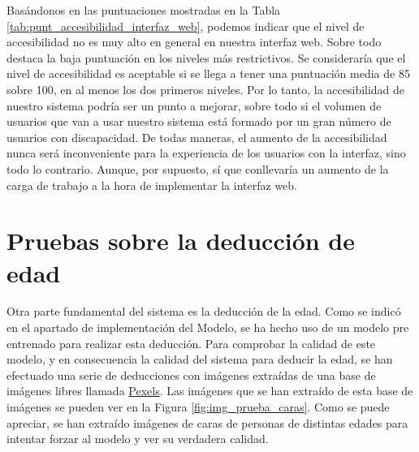 Basándonos en las puntuaciones mostradas en la Tabla \ref{tab:punt_accesibilidad_interfaz_web}, podemos indicar que el nivel de accesibilidad no es muy alto en general en nuestra interfaz web. Sobre todo destaca la baja puntuación en los niveles más restrictivos. Se consideraría que el nivel de accesibilidad es aceptable si se llega a tener una puntuación media de 85 sobre 100, en al menos los dos primeros niveles. Por lo tanto, la accesibilidad de nuestro sistema podría ser un punto a mejorar, sobre todo si el volumen de usuarios que van a usar nuestro sistema está formado por un gran número de usuarios con discapacidad. De todas maneras, el aumento de la accesibilidad nunca será inconveniente para la experiencia de los usuarios con la interfaz, sino todo lo contrario. Aunque, por supuesto, sí que conllevaría un aumento de la carga de trabajo a la hora de implementar la interfaz web.

\section{Pruebas sobre la deducción de edad}

Otra parte fundamental del sistema es la deducción de la edad. Como se indicó en el apartado de implementación del Modelo, se ha hecho uso de un modelo pre entrenado para realizar esta deducción. Para comprobar la calidad de este modelo, y en consecuencia la calidad del sistema para deducir la edad, se han efectuado una serie de deducciones con imágenes extraídas de una base de imágenes libres llamada \href{https://www.pexels.com/es-es/}{Pexels}. Las imágenes que se han extraído de esta base de imágenes se pueden ver en la Figura \ref{fig:img_prueba_caras}. Como se puede apreciar, se han extraído imágenes de caras de personas de distintas edades para intentar forzar al modelo y ver su verdadera calidad.

